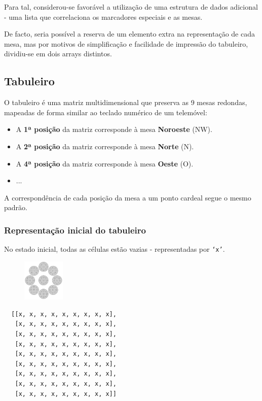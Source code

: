 \documentclass[a4paper]{article}
\begin{document}
Para tal, considerou-se favorável a utilização de uma estrutura de dados adicional - uma lista que correlaciona os marcadores especiais e as mesas.

De facto, seria possível a reserva de um elemento extra na representação de cada mesa, mas por motivos de simplificação e facilidade de impressão do tabuleiro, dividiu-se em dois arrays distintos.

\subsection{Tabuleiro}
O tabuleiro é uma matriz multidimensional que preserva as 9 mesas redondas, mapeadas de forma similar ao teclado numérico de um telemóvel:

\begin{itemize}
\itemsep0em
\item A \textbf{1ª posição} da matriz corresponde à mesa \textbf{Noroeste} (NW).
\item A \textbf{2ª posição} da matriz corresponde à mesa \textbf{Norte} (N).
\item A \textbf{4ª posição} da matriz corresponde à mesa \textbf{Oeste} (O).
\item ...
\end{itemize}

A correspondência de cada posição da mesa a um ponto cardeal segue o mesmo padrão.

\subsubsection{Representação inicial do tabuleiro}
No estado inicial, todas as células estão vazias - representadas por \texttt{`x'}.

\begin{figure}
\centering
\includegraphics[width=0.18\textwidth]{board-setup-1.png}
\end{figure}

\begin{lstlisting}
  [[x, x, x, x, x, x, x, x, x],
   [x, x, x, x, x, x, x, x, x],
   [x, x, x, x, x, x, x, x, x],
   [x, x, x, x, x, x, x, x, x],
   [x, x, x, x, x, x, x, x, x],
   [x, x, x, x, x, x, x, x, x],
   [x, x, x, x, x, x, x, x, x],
   [x, x, x, x, x, x, x, x, x],
   [x, x, x, x, x, x, x, x, x]]
\end{lstlisting}
\end{document}
